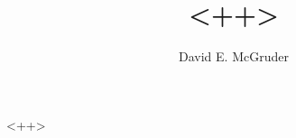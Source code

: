\documentclass[12pt,letterpaper,oneside]{article}
\title{ <++>}
\author{David E. McGruder}
\begin{document}
\maketitle
\thispagestyle{empty}

<++>
\end{document}
